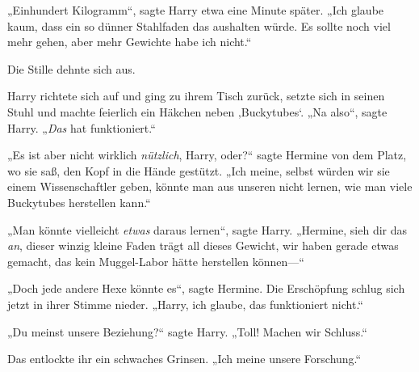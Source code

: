 „Einhundert Kilogramm“, sagte Harry etwa eine Minute später. „Ich glaube kaum, dass ein so dünner Stahlfaden das aushalten würde. Es sollte noch viel mehr gehen, aber mehr Gewichte habe ich nicht.“

Die Stille dehnte sich aus.

Harry richtete sich auf und ging zu ihrem Tisch zurück, setzte sich in seinen Stuhl und machte feierlich ein Häkchen neben ‚Buckytubes‘. „Na also“, sagte Harry. „\emph{Das} hat funktioniert.“

„Es ist aber nicht wirklich \emph{nützlich}, Harry, oder?“ sagte Hermine von dem Platz, wo sie saß, den Kopf in die Hände gestützt. „Ich meine, selbst würden wir sie einem Wissenschaftler geben, könnte man aus unseren nicht lernen, wie man viele Buckytubes herstellen kann.“

„Man könnte vielleicht \emph{etwas} daraus lernen“, sagte Harry. „Hermine, sieh dir das \emph{an}, dieser winzig kleine Faden trägt all dieses Gewicht, wir haben gerade etwas gemacht, das kein Muggel-Labor hätte herstellen können—“

„Doch jede andere Hexe könnte es“, sagte Hermine. Die Erschöpfung schlug sich jetzt in ihrer Stimme nieder. „Harry, ich glaube, das funktioniert nicht.“

„Du meinst unsere Beziehung?“ sagte Harry. „Toll! Machen wir Schluss.“

Das entlockte ihr ein schwaches Grinsen. „Ich meine unsere Forschung.“

